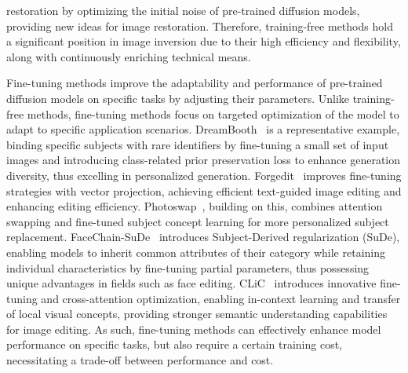 restoration by optimizing the initial noise of pre-trained diffusion models, providing new ideas for image restoration. Therefore, training-free methods hold a significant position in image inversion due to their high efficiency and flexibility, along with continuously enriching technical means.

Fine-tuning methods improve the adaptability and performance of pre-trained diffusion models on specific tasks by adjusting their parameters. Unlike training-free methods, fine-tuning methods focus on targeted optimization of the model to adapt to specific application scenarios. DreamBooth~\cite{DreamBooth} is a representative example, binding specific subjects with rare identifiers by fine-tuning a small set of input images and introducing class-related prior preservation loss to enhance generation diversity, thus excelling in personalized generation. Forgedit~\cite{Forgedit} improves fine-tuning strategies with vector projection, achieving efficient text-guided image editing and enhancing editing efficiency. Photoswap~\cite{Photoswap}, building on this, combines attention swapping and fine-tuned subject concept learning for more personalized subject replacement. FaceChain-SuDe~\cite{FaceChain-SuDe} introduces Subject-Derived regularization (SuDe), enabling models to inherit common attributes of their category while retaining individual characteristics by fine-tuning partial parameters, thus possessing unique advantages in fields such as face editing. CLiC~\cite{CLiC} introduces innovative fine-tuning and cross-attention optimization, enabling in-context learning and transfer of local visual concepts, providing stronger semantic understanding capabilities for image editing. As such, fine-tuning methods can effectively enhance model performance on specific tasks, but also require a certain training cost, necessitating a trade-off between performance and cost.

